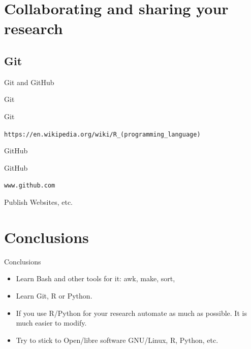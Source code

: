 \documentclass{beamer}
\begin{document}
\section[Collaborating and sharing]{Collaborating and sharing your research}


\subsection{Git}{Git and GitHub}


\begin{frame}{Git} %

Git 

\texttt{https://en.wikipedia.org/wiki/R\_(programming\_language)}
\end{frame}


\begin{frame}{GitHub} %

GitHub 

\texttt{www.github.com}

Publish Websites, etc.

\end{frame}




\section{Conclusions}

\begin{frame}{Conclusions} %

\begin{itemize}
  \item Learn Bash and other tools for it: awk, make, sort, 
  \item Learn  Git, R or Python.
  \item If you use R/Python for your research automate as much as possible. It is much easier to modify.
  \item Try to stick to Open/libre software GNU/Linux, R, Python, etc.
\end{itemize}

\end{frame}
\end{document}
